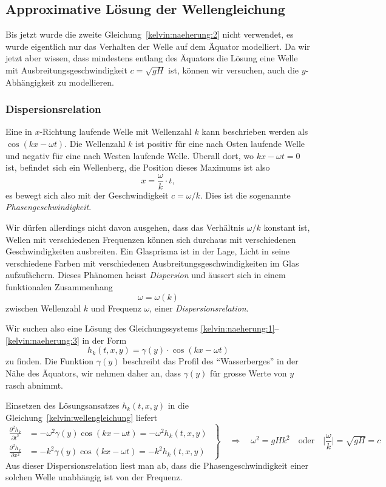 \subsection{Approximative Lösung der Wellengleichung}
Bis jetzt wurde die zweite Gleichung~\eqref{kelvin:naeherung:2}
nicht verwendet, es wurde eigentlich nur das Verhalten der Welle auf
dem Äquator modelliert.
Da wir jetzt aber wissen, dass mindestens entlang des Äquators die Lösung
eine Welle mit Ausbreitungsgeschwindigkeit $c=\sqrt{gH}$ ist, können
wir versuchen, auch die $y$-Abhängigkeit zu modellieren.

\subsubsection{Dispersionsrelation}
Eine in $x$-Richtung laufende Welle mit Wellenzahl $k$ kann beschrieben werden
als $\cos(kx-\omega t)$.
Die Wellenzahl $k$ ist positiv für eine nach Osten laufende Welle und negativ
für eine nach Westen laufende Welle.
Überall dort, wo $kx-\omega t=0$ ist, befindet sich ein Wellenberg,
die Position dieses Maximums ist also
\[
x=\frac{\omega}{k}\cdot t,
\]
es bewegt sich also mit der Geschwindigkeit $c=\omega/k$.
Dies ist die sogenannte {\em Phasengeschwindigkeit}.
%

Wir dürfen allerdings nicht davon ausgehen, dass das Verhältnis $\omega/k$
konstant ist, Wellen mit verschiedenen Frequenzen können sich durchaus
mit verschiedenen Geschwindigkeiten ausbreiten.
Ein Glasprisma ist in der Lage, Licht in seine verschiedene Farben
mit verschiedenen Ausbreitungsgeschwindigkeiten im Glas aufzufächern. 
Dieses Phänomen heisst {\em Dispersion} und äussert sich in einem
%
funktionalen Zusammenhang
\[
\omega = \omega(k)
\]
zwischen Wellenzahl $k$ und Frequenz $\omega$, einer {\em Dispersionsrelation}.
%

Wir suchen also eine Lösung des Gleichungssystems
\eqref{kelvin:naeherung:1}--\eqref{kelvin:naeherung:3}
in der Form
\[
h_k(t,x,y) = \gamma(y)\cdot \cos(kx-\omega t)
\]
zu finden.
Die Funktion $\gamma(y)$ beschreibt das Profil des ``Wasserberges'' 
in der Nähe des Äquators, wir nehmen daher an, dass $\gamma(y)$ für grosse
Werte von $y$ rasch abnimmt.

Einsetzen des Lösungsansatzes $h_k(t,x,y)$ in die
Gleichung~\eqref{kelvin:wellengleichung} liefert
\begin{equation}
\left.
\begin{aligned}
\frac{\partial^2 h_k}{\partial t^2}
&=
- \omega^2 \gamma(y) \cos(kx-\omega t)
=
-\omega^2 h_k(t,x,y)
\\
\frac{\partial^2 h_k}{\partial x^2}
&=
-
k^2
\gamma(y)
\cos (kx-\omega t)
=
-k^2 h_k(t,x,y)
\end{aligned}
\;\right\}
\quad
\Rightarrow
\quad
\omega^2=gHk^2
\quad\text{oder}\quad
\biggl|
\frac{\omega}{k}\biggr|
=\sqrt{gH}=c
\end{equation}
Aus dieser Dispersionsrelation
liest man ab, dass die Phasengeschwindigkeit einer solchen
Welle unabhängig ist von der Frequenz.

